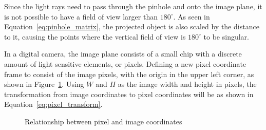 Since the light rays need to pass through the pinhole and onto the image plane, it is not possible to have a field of view larger than $180^\circ$. As seen in Equation~\eqref{eq:pinhole_matrix}, the projected object is also scaled by the distance to it, causing the points where the vertical field of view is $180^\circ$ to be singular. 

In a digital camera, the image plane consists of a small chip with a discrete amount of light sensitive elements, or pixels. Defining a new pixel coordinate frame to consist of the image pixels, with the origin in the upper left corner, as shown in Figure~\ref{fig:rel_img_pixel}. Using $W$ and $H$ as the image width and height in pixels, the transformation from image coordinates to pixel coordinates will be as shown in Equation~\eqref{eq:pixel_transform}.

\begin{figure}[!htb]
    \centering
    
    \caption{Relationship between pixel and image coordinates}
    \label{fig:rel_img_pixel}
\end{figure}

